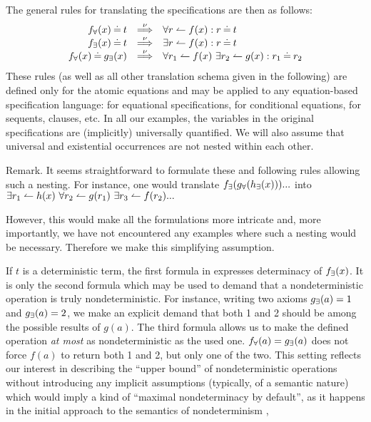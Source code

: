 The general rules for translating the specifications are then as follows: \begin{equation}\label{eq:isresult}
\begin{array}{rcl}
\Bre f(x) \Eq t & \TTo{\nu} & \forall r\isres f(x) : r\Eq t\\ \Bree f(x) \Eq t & \TTo{\nu} & \exists r\isres f(x) : r\Eq t \\ \Bre f(x) \Eq \Bree g(x) & \TTo{\nu} & \forall r_1\isres f(x)\ \exists r_2\isres g(x): r_1\Eq r_2
\end{array}
\end{equation}
These rules (as well as all other translation schema given in the following) are defined only for the atomic equations and may be applied
to any equation-based specification language: for equational specifications, for conditional equations, for sequents, clauses, etc. In all our examples, the variables in the original specifications are (implicitly) universally quantified. We will also assume that 
universal and existential occurrences are not nested within each other.
\begin{SREMARK}{Remark.}
It seems straightforward to formulate these and following rules allowing such a nesting.
For instance, one would translate $f_\exists(g_\forall(h_\exists(x)))...$ into $\exists r_1\leftharpoonup h(x)\ \forall r_2\leftharpoonup g(r_1)\ \exists r_3\leftharpoonup f(r_2)...$

However, this would make all the formulations more intricate and, more importantly, we have not encountered any examples where such a nesting would be necessary. Therefore we make this simplifying assumption. \end{SREMARK}
If $t$ is a deterministic term, the first formula in  expresses determinacy of $f_\exists(x)$.
It is only the second formula which may be used to demand that a nondeterministic operation is truly nondeterministic. For instance, writing two axioms $g_\exists(a)=1$ and $g_\exists(a)=2$, we make an explicit demand that both 1 and 2 should be among the possible results of $g(a)$. The third formula allows us to make the defined operation {\em at most} as nondeterministic as the used one. $f_\forall(a)= g_\exists(a)$ does not force $f(a)$ to return both 1 and 2, but only one of the two. This setting reflects our interest in
describing the ``upper bound'' of nondeterministic operations without introducing any implicit assumptions (typically, of a semantic nature) which would imply a kind of ``maximal nondeterminacy by default'', as it happens in the initial approach to the semantics of nondeterminism \cite{HusB},
